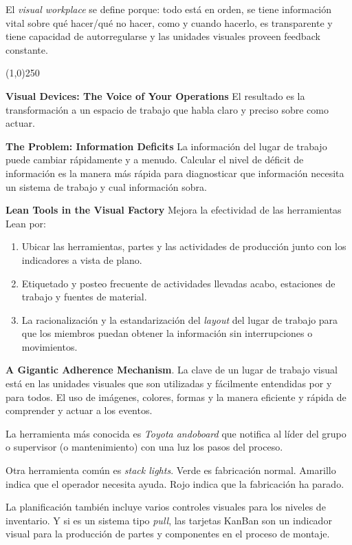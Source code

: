 \documentclass[oneside]{book}
\begin{document}
El \textit{visual workplace} se define porque: todo está en orden, se tiene información vital sobre qué hacer/qué no hacer, como y cuando hacerlo, es transparente y tiene capacidad de autorregularse y las unidades visuales proveen feedback constante.

\begin{center}
	\line(1,0){250}
\end{center}


\textbf{Visual Devices: The Voice of Your Operations} El resultado es la transformación a un espacio de trabajo que habla claro y preciso sobre como actuar.

\textbf{The Problem: Information Deficits} La información del lugar de trabajo puede cambiar rápidamente y a menudo. Calcular el nivel de déficit de información es la manera más rápida para diagnosticar que información necesita un sistema de trabajo y cual información sobra.

\textbf{Lean Tools in the Visual Factory} Mejora la efectividad de las herramientas Lean por:

\begin{enumerate}
\item Ubicar las herramientas, partes y las actividades de producción junto con los indicadores a vista de plano.
\item Etiquetado y posteo frecuente de actividades llevadas acabo, estaciones de trabajo y fuentes de material.
\item La racionalización y la estandarización del \textit{layout} del lugar de trabajo para que los miembros puedan obtener la información sin interrupciones o movimientos.
\end{enumerate}

\textbf{A Gigantic Adherence Mechanism}. La clave de un lugar de trabajo visual está en las unidades visuales que son utilizadas y fácilmente entendidas por y para todos. El uso de imágenes, colores, formas y la manera eficiente y rápida de comprender y actuar a los eventos.

La herramienta más conocida es \textit{Toyota andoboard} que notifica al líder del grupo o supervisor (o mantenimiento) con una luz los pasos del proceso.

Otra herramienta común es \textit{stack lights}. Verde es fabricación normal. Amarillo indica que el operador necesita ayuda. Rojo indica que la fabricación ha parado.

La planificación también incluye varios controles visuales para los niveles de inventario. Y si es un sistema tipo \textit{pull}, las tarjetas KanBan son un indicador visual para la producción de partes y componentes en el proceso de montaje.
\end{document}

